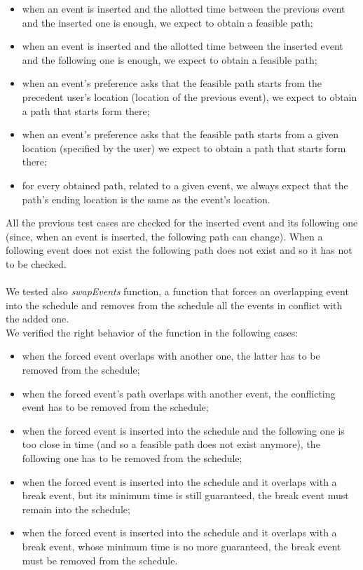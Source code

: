 \begin{itemize}
	\item when an event is inserted and the allotted time between the previous event and the inserted one is enough, we expect to obtain a feasible path;
	\item when an event is inserted and the allotted time between the inserted event and the following one is enough, we expect to obtain a feasible path;
	\item when an event's preference asks that the feasible path starts from the precedent user's location (location of the previous event), we expect to obtain a path that starts form there;
	\item when an event's preference asks that the feasible path starts from a given location (specified by the user) we expect to obtain a path that starts form there;
	\item for every obtained path, related to a given event, we always expect that the path's ending location is the same as the event's location.
\end{itemize}
\noindent
All the previous test cases are checked for the inserted event and its following one (since, when an event is inserted, the following path can change). When a following event does not exist the following path does not exist and so it has not to be checked. \\ \\
\noindent
We tested also \textit{swapEvents} function, a function that forces an overlapping event into the schedule and removes from the schedule all the events in conflict with the added one. \\
We verified the right behavior of the function in the following cases:
\begin{itemize}
	\item when the forced event overlaps with another one, the latter has to be removed from the schedule;
	\item when the forced event's path overlaps with another event, the conflicting event has to be removed from the schedule;
	\item when the forced event is inserted into the schedule and the following one is too close in time (and so a feasible path does not exist anymore), the following one has to be removed from the schedule;
	\item when the forced event is inserted into the schedule and it overlaps with a break event, but its minimum time is still guaranteed, the break event must remain into the schedule;
	\item when the forced event is inserted into the schedule and it overlaps with a break event, whose minimum time is no more guaranteed, the break event must be removed from the schedule. \\
\end{itemize}
